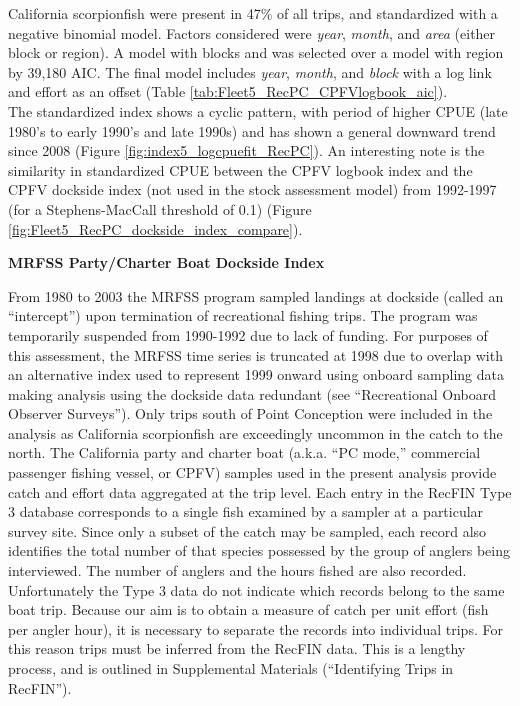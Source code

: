 \documentclass[12pt,]{article}
\begin{document}
California scorpionfish were present in 47\% of all trips, and
standardized with a negative binomial model. Factors considered were
\emph{year}, \emph{month}, and \emph{area} (either block or region). A
model with blocks and was selected over a model with region by 39,180
AIC. The final model includes \emph{year}, \emph{month}, and
\emph{block} with a log link and effort as an offset (Table
\ref{tab:Fleet5_RecPC_CPFVlogbook_aic}).\\
The standardized index shows a cyclic pattern, with period of higher
CPUE (late 1980's to early 1990's and late 1990s) and has shown a
general downward trend since 2008 (Figure
\ref{fig:index5_logcpuefit_RecPC}). An interesting note is the
similarity in standardized CPUE between the CPFV logbook index and the
CPFV dockside index (not used in the stock assessment model) from
1992-1997 (for a Stephens-MacCall threshold of 0.1) (Figure
\ref{fig:Fleet5_RecPC_dockside_index_compare}).

\textbf{MRFSS Party/Charter Boat Dockside Index}

From 1980 to 2003 the MRFSS program sampled landings at dockside (called
an ``intercept'') upon termination of recreational fishing trips. The
program was temporarily suspended from 1990-1992 due to lack of funding.
For purposes of this assessment, the MRFSS time series is truncated at
1998 due to overlap with an alternative index used to represent 1999
onward using onboard sampling data making analysis using the dockside
data redundant (see ``Recreational Onboard Observer Surveys''). Only
trips south of Point Conception were included in the analysis as
California scorpionfish are exceedingly uncommon in the catch to the
north. The California party and charter boat (a.k.a. ``PC mode,''
commercial passenger fishing vessel, or CPFV) samples used in the
present analysis provide catch and effort data aggregated at the trip
level. Each entry in the RecFIN Type 3 database corresponds to a single
fish examined by a sampler at a particular survey site. Since only a
subset of the catch may be sampled, each record also identifies the
total number of that species possessed by the group of anglers being
interviewed. The number of anglers and the hours fished are also
recorded. Unfortunately the Type 3 data do not indicate which records
belong to the same boat trip. Because our aim is to obtain a measure of
catch per unit effort (fish per angler hour), it is necessary to
separate the records into individual trips. For this reason trips must
be inferred from the RecFIN data. This is a lengthy process, and is
outlined in Supplemental Materials (``Identifying Trips in RecFIN'').
\end{document}
